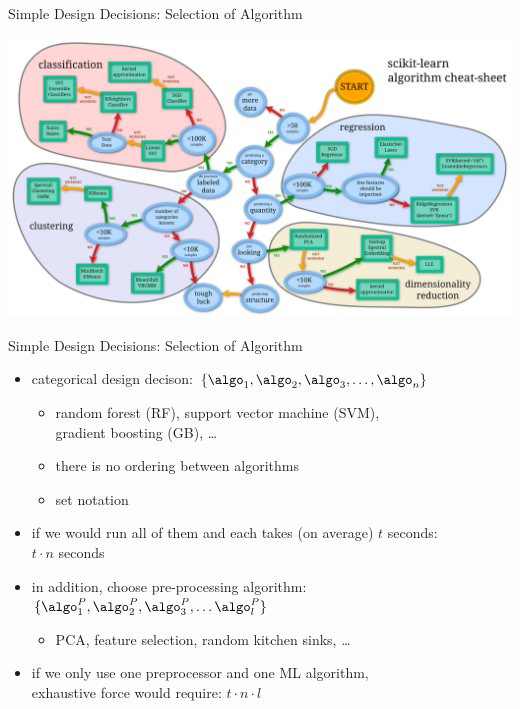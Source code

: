 \begin{frame}[c]{Simple Design Decisions: Selection of Algorithm}

\includegraphics[width=1.0\textwidth]{images/sklearn-cheat}


\end{frame}
\begin{frame}[c]{Simple Design Decisions: Selection of Algorithm}

\begin{itemize}
  \item categorical design decison: $\{ \algo_1, \algo_2, \algo_3, \ldots, \algo_n\}$
  \begin{itemize}
	\item random forest (RF), support vector machine (SVM),\\ gradient boosting (GB), \ldots
    \item there is no ordering between algorithms
    \item set notation
  \end{itemize}
  \pause
  \item if we would run all of them and each takes (on average) $t$ seconds:\\
  $t \cdot n$ seconds
  \pause
  \smallskip
  \item in addition, choose pre-processing algorithm: $\{\algo_1^P, \algo_2^P, \algo_3^P, \ldots \algo_l^P \}$
  \begin{itemize}
    \item PCA, feature selection, random kitchen sinks, \ldots
  \end{itemize}
  \item if we only use one preprocessor and one ML algorithm,\\ exhaustive force would require:
  $t \cdot n \cdot l$
\end{itemize}

\end{frame}
